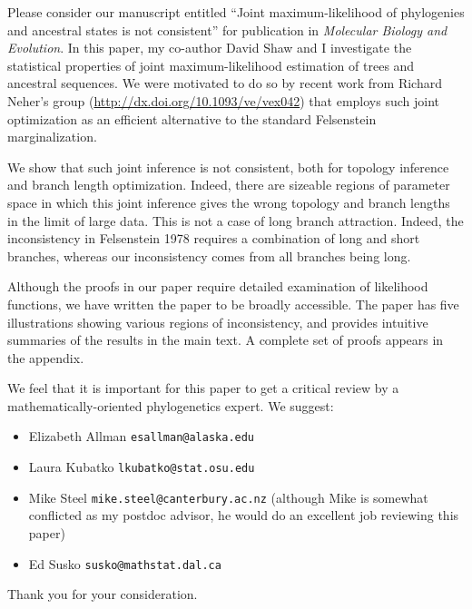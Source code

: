 \documentclass[letterpaper,10pt]{article}
\begin{document}
Please consider our manuscript entitled ``Joint maximum-likelihood of phylogenies and ancestral states is not consistent'' for publication in \textit{Molecular Biology and Evolution}.
In this paper, my co-author David Shaw and I investigate the statistical properties of joint maximum-likelihood estimation of trees and ancestral sequences.
We were motivated to do so by recent work from Richard Neher's group (\url{http://dx.doi.org/10.1093/ve/vex042}) that employs such joint optimization as an efficient alternative to the standard Felsenstein marginalization.

We show that such joint inference is not consistent, both for topology inference and branch length optimization.
Indeed, there are sizeable regions of parameter space in which this joint inference gives the wrong topology and branch lengths in the limit of large data.
This is not a case of long branch attraction.
Indeed, the inconsistency in Felsenstein 1978 requires a combination of long and short branches, whereas our inconsistency comes from all branches being long.

Although the proofs in our paper require detailed examination of likelihood functions, we have written the paper to be broadly accessible.
The paper has five illustrations showing various regions of inconsistency, and provides intuitive summaries of the results in the main text.
A complete set of proofs appears in the appendix.

We feel that it is important for this paper to get a critical review by a mathematically-oriented phylogenetics expert.
We suggest:
\begin{itemize}
\item Elizabeth Allman \texttt{esallman@alaska.edu}
\item Laura Kubatko \texttt{lkubatko@stat.osu.edu}
\item Mike Steel \texttt{mike.steel@canterbury.ac.nz} (although Mike is somewhat conflicted as my postdoc advisor, he would do an excellent job reviewing this paper)
\item Ed Susko \texttt{susko@mathstat.dal.ca}
\end{itemize}

Thank you for your consideration.
\end{document}
